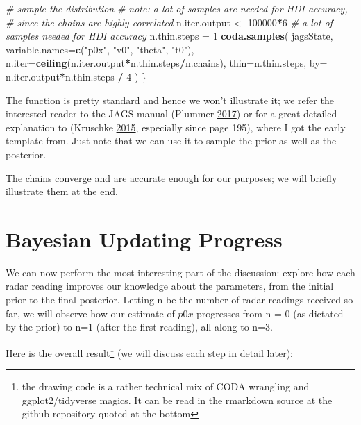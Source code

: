 \documentclass[]{article}
\newenvironment{Shaded}{\begin{snugshade}}{\end{snugshade}}
\newcommand{\CommentTok}[1]{\textcolor[rgb]{0.56,0.35,0.01}{\textit{#1}}}
\newcommand{\DataTypeTok}[1]{\textcolor[rgb]{0.13,0.29,0.53}{#1}}
\newcommand{\DecValTok}[1]{\textcolor[rgb]{0.00,0.00,0.81}{#1}}
\newcommand{\KeywordTok}[1]{\textcolor[rgb]{0.13,0.29,0.53}{\textbf{#1}}}
\newcommand{\NormalTok}[1]{#1}
\newcommand{\OperatorTok}[1]{\textcolor[rgb]{0.81,0.36,0.00}{\textbf{#1}}}
\newcommand{\StringTok}[1]{\textcolor[rgb]{0.31,0.60,0.02}{#1}}
\begin{document}
\begin{Shaded}
\begin{Highlighting}[]
  \CommentTok{# sample the distribution}
  \CommentTok{# note: a lot of samples are needed for HDI accuracy,}
  \CommentTok{#       since the chains are highly correlated}
\NormalTok{  n.iter.output <-}\StringTok{ }\DecValTok{100000}\OperatorTok{*}\DecValTok{6} \CommentTok{# a lot of samples needed for HDI accuracy}
\NormalTok{  n.thin.steps =}\StringTok{ }\DecValTok{1}
  \KeywordTok{coda.samples}\NormalTok{( jagsState, }
                \DataTypeTok{variable.names=}\KeywordTok{c}\NormalTok{(}\StringTok{"p0x"}\NormalTok{, }\StringTok{"v0"}\NormalTok{, }\StringTok{"theta"}\NormalTok{, }\StringTok{"t0"}\NormalTok{),}
                \DataTypeTok{n.iter=}\KeywordTok{ceiling}\NormalTok{(n.iter.output}\OperatorTok{*}\NormalTok{n.thin.steps}\OperatorTok{/}\NormalTok{n.chains),}
                \DataTypeTok{thin=}\NormalTok{n.thin.steps,}
                \DataTypeTok{by=}\NormalTok{ n.iter.output}\OperatorTok{*}\NormalTok{n.thin.steps }\OperatorTok{/}\StringTok{ }\DecValTok{4}
\NormalTok{              )}
\NormalTok{\}}
\end{Highlighting}
\end{Shaded}

The function is pretty standard and hence we won't illustrate it; we
refer the interested reader to the JAGS manual (Plummer
\protect\hyperlink{ref-JAGSmanual}{2017}) or for a great detailed
explanation to (Kruschke \protect\hyperlink{ref-DBDA2E}{2015},
especially since page 195), where I got the early template from. Just
note that we can use it to sample the prior as well as the posterior.

The chains converge and are accurate enough for our purposes; we will
briefly illustrate them at the end.

\hypertarget{bayesian-updating-progress}{%
\section{Bayesian Updating Progress}\label{bayesian-updating-progress}}

We can now perform the most interesting part of the discussion: explore
how each radar reading improves our knowledge about the parameters, from
the initial prior to the final posterior. Letting n be the number of
radar readings received so far, we will observe how our estimate of
\(p0x\) progresses from n = 0 (as dictated by the prior) to n=1 (after
the first reading), all along to n=3.

Here is the overall result\footnote{the drawing code is a rather
  technical mix of CODA wrangling and ggplot2/tidyverse magics. It can
  be read in the rmarkdown source at the github repository quoted at the
  bottom} (we will discuss each step in detail later):
\end{document}
